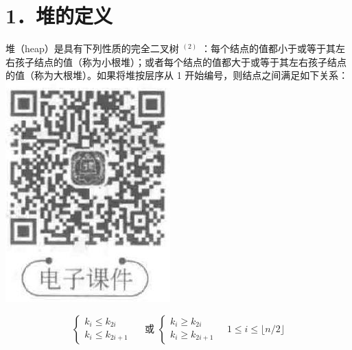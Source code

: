\documentclass[10pt]{article}
\begin{document}
\section*{1．堆的定义}
堆（heap）是具有下列性质的完全二叉树 ${ }^{(2)}$ ：每个结点的值都小于或等于其左右孩子结点的值（称为小根堆）；或者每个结点的值都大于或等于其左右孩子结点的值（称为大根堆）。如果将堆按层序从 1 开始编号，则结点之间满足如下关系：\\
\includegraphics[max width=\textwidth, center]{2025_06_06_704745ea57b15b2333e5g-282(2)}

$$
\left\{\begin{array} { l } 
{ k _ { i } \leqslant k _ { 2 i } } \\
{ k _ { i } \leqslant k _ { 2 i + 1 } }
\end{array} \quad \text { 或 } \left\{\begin{array}{l}
k_{i} \geqslant k_{2 i} \\
k_{i} \geqslant k_{2 i+1}
\end{array} \quad 1 \leqslant i \leqslant\lfloor n / 2\rfloor\right.\right.
$$
\end{document}
